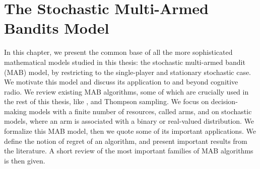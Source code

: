 
\chapter{The Stochastic Multi-Armed Bandits Model}
\label{chapter:2}

\graphicspath{{2-Chapters/2-Chapter/Images/}}


\abstractStartChapter{}%
%
In this chapter, we present the common base of all the more sophisticated mathematical models studied in this thesis: the stochastic multi-armed bandit (MAB) model, by restricting to the single-player and stationary stochastic case.
%
We motivate this model and discuss its application to and beyond cognitive radio.
We review existing MAB algorithms,
some of which are crucially used in the rest of this thesis, like \UCB, \klUCB{} and Thompson sampling.
%
We focus on decision-making models with a finite number of resources, called arms, and on stochastic models, where an arm is associated with a binary or real-valued distribution.
%
We formalize this MAB model, then we quote some of its important applications.
We define the notion of regret of an algorithm, and present important results from the literature. A short review of the most important families of MAB algorithms is then given.

\minitocStartChapter{}



